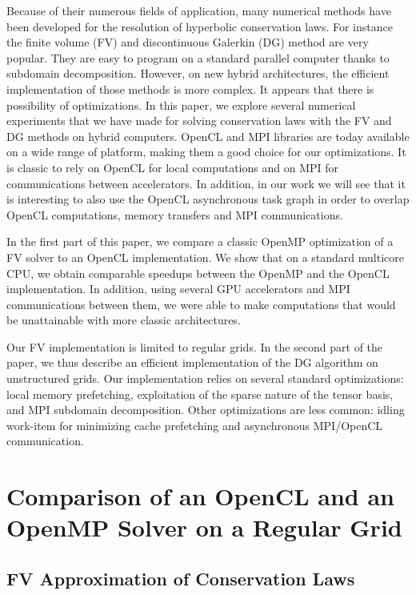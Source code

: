 \documentclass{svmult}
\begin{document}
Because of their numerous fields of application, many numerical
methods have been developed for the resolution of hyperbolic
conservation laws. For instance the finite volume (FV) and
discontinuous Galerkin (DG) method are very popular. They are easy to
program on a standard parallel computer thanks to subdomain
decomposition. However, on new hybrid architectures, the efficient
implementation of those methods is more complex. It appears that there
is possibility of optimizations. In this paper, we explore several
numerical experiments that we have made for solving conservation laws
with the FV and DG methods on hybrid computers. OpenCL and MPI
libraries are today available on a wide range of platform, making them
a good choice for our optimizations.  It is classic to rely on OpenCL
for local computations and on MPI for communications between
accelerators. In addition, in our work we will see that it is
interesting to also use the OpenCL asynchronous task graph in order to
overlap OpenCL computations, memory transfers and MPI communications.

In the first part of this paper, we compare a classic OpenMP
optimization of a FV solver to an OpenCL implementation. We show that
on a standard multicore CPU, we obtain comparable speedups between the
OpenMP and the OpenCL implementation. In addition, using several GPU
accelerators and MPI communications between them, we were able to make
computations that would be unattainable with more classic
architectures.

Our FV implementation is limited to regular grids. In the second part
of the paper, we thus describe an efficient implementation of the DG
algorithm on unstructured grids.  Our implementation relies on several
standard optimizations: local memory prefetching, exploitation of the
sparse nature of the tensor basis, and MPI subdomain
decomposition. Other optimizations are less common: idling work-item
for minimizing cache prefetching and asynchronous MPI/OpenCL
communication.

\section{\label{fv}Comparison of an OpenCL and an OpenMP Solver on a Regular Grid}

\subsection{FV Approximation of Conservation Laws}
\end{document}
